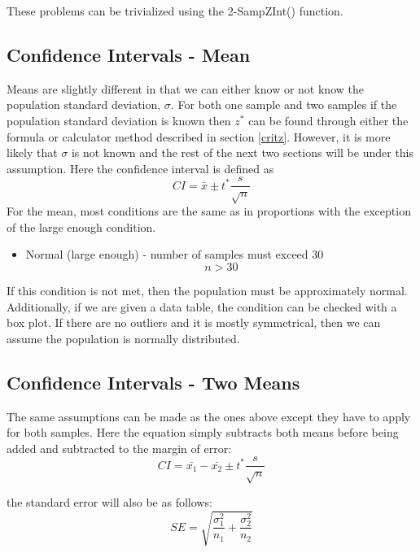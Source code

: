 \documentclass{article}
\theoremstyle{definition}
\theoremstyle{remark}
\begin{document}
These problems can be trivialized using the 2-SampZInt() function.

\subsection{Confidence Intervals - Mean}

Means are slightly different in that we can either know or not know the population standard deviation, $\sigma$. For both one sample and two
samples if the population standard deviation is known then $z^{*}$ can be found through either the formula or calculator method described in section \ref{critz}.
However, it is more likely that $\sigma$ is not known and the rest of the next two sections will be under this assumption. Here the confidence interval is 
defined as
\begin{equation}
  CI = \bar{x} \pm t^{*} \frac{s}{\sqrt{n}}
\end{equation}
For the mean, most conditions are the same as in proportions with the exception of the large enough condition. 
\begin{itemize}
  \item Normal (large enough) - number of samples must exceed 30
    \begin{equation}
      n > 30
    \end{equation}
\end{itemize}
If this condition is not met, then the population must be approximately normal.
Additionally, if we are given a data table, the condition can be checked with a box plot. If there are no outliers and it is mostly symmetrical,
then we can assume the population is normally distributed.

\subsection{Confidence Intervals - Two Means}

The same assumptions can be made as the ones above except they have to apply for both samples.
Here the equation simply subtracts both means before being added and subtracted to the margin of error:
\begin{equation}
  CI = \bar{x_1} - \bar{x_2} \pm t^{*} \frac{s}{\sqrt{n}}
\end{equation}

the standard error will also be as follows:
\begin{equation}
  SE = \sqrt{\frac{\sigma_1^{2}}{n_1}+\frac{\sigma_2^{2}}{n_2}}
\end{equation}
\end{document}
